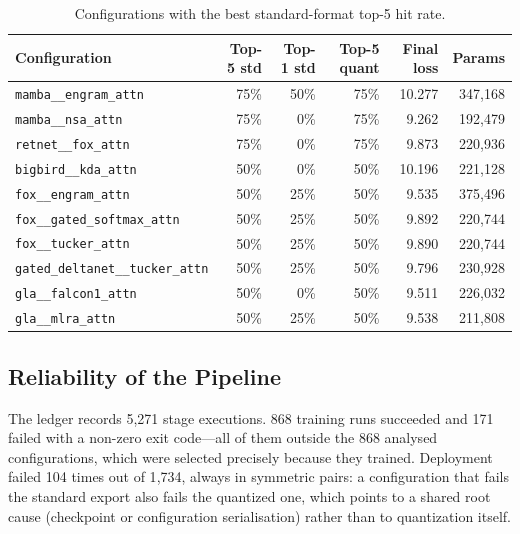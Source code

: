 \begin{table}[H]
\centering
\small
\caption{Configurations with the best standard-format top-5 hit rate.}
\label{tab:r2-inference}
\begin{tabular}{lrrrrr}
\toprule
Configuration & Top-5 std & Top-1 std & Top-5 quant & Final loss & Params \\
\midrule
\texttt{mamba\_\_engram\_attn} & 75\% & 50\% & 75\% & 10.277 & 347{,}168 \\
\texttt{mamba\_\_nsa\_attn}    & 75\% & 0\%  & 75\% & 9.262  & 192{,}479 \\
\texttt{retnet\_\_fox\_attn}  & 75\% & 0\%  & 75\% & 9.873  & 220{,}936 \\
\texttt{bigbird\_\_kda\_attn}  & 50\% & 0\%  & 50\% & 10.196 & 221{,}128 \\
\texttt{fox\_\_engram\_attn}   & 50\% & 25\% & 50\% & 9.535  & 375{,}496 \\
\texttt{fox\_\_gated\_softmax\_attn} & 50\% & 25\% & 50\% & 9.892 & 220{,}744 \\
\texttt{fox\_\_tucker\_attn}   & 50\% & 25\% & 50\% & 9.890  & 220{,}744 \\
\texttt{gated\_deltanet\_\_tucker\_attn} & 50\% & 25\% & 50\% & 9.796 & 230{,}928 \\
\texttt{gla\_\_falcon1\_attn}  & 50\% & 0\%  & 50\% & 9.511  & 226{,}032 \\
\texttt{gla\_\_mlra\_attn}     & 50\% & 25\% & 50\% & 9.538  & 211{,}808 \\
\bottomrule
\end{tabular}
\end{table}

\subsection{Reliability of the Pipeline}

The ledger records 5{,}271 stage executions. 868 training runs succeeded and 171 failed with a non-zero exit code---all of them outside the 868 analysed configurations, which were selected precisely because they trained. Deployment failed 104 times out of 1{,}734, always in symmetric pairs: a configuration that fails the standard export also fails the quantized one, which points to a shared root cause (checkpoint or configuration serialisation) rather than to quantization itself.

